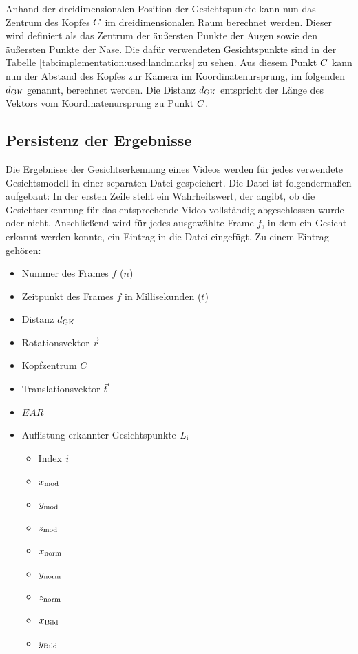 Anhand der dreidimensionalen Position der Gesichtspunkte kann nun das Zentrum des Kopfes $C$ im dreidimensionalen Raum berechnet werden. Dieser wird definiert als das Zentrum der äußersten Punkte der Augen sowie den äußersten Punkte der Nase. Die dafür verwendeten Gesichtspunkte sind in der Tabelle  \ref{tab:implementation:used:landmarks} zu sehen.
Aus diesem Punkt $C$ kann nun der Abstand des Kopfes zur Kamera im Koordinatenursprung, im folgenden $d_{\text{GK}}$ genannt, berechnet werden. Die Distanz $d_{\text{GK}}$ entspricht der Länge des Vektors vom Koordinatenursprung zu Punkt $C$.

\subsection{Persistenz der Ergebnisse}

Die Ergebnisse der Gesichtserkennung eines Videos werden für jedes verwendete Gesichtsmodell in einer separaten Datei gespeichert. Die Datei ist folgendermaßen aufgebaut: In der ersten Zeile steht ein Wahrheitswert, der angibt, ob die Gesichtserkennung für das entsprechende Video vollständig abgeschlossen wurde oder nicht. Anschließend wird für jedes ausgewählte Frame $f$, in dem ein Gesicht erkannt werden konnte, ein Eintrag in die Datei eingefügt. Zu einem Eintrag gehören:

\begin{itemize}
    \item Nummer des Frames $f$ ($n$)
    \item Zeitpunkt des Frames $f$ in Millisekunden ($t$)
    \item Distanz $d_{\text{GK}}$
    \item Rotationsvektor $\vec{r}$
    \item Kopfzentrum $C$
    \item Translationsvektor $\vec{t}$ 
    \item $EAR$
    \item Auflistung erkannter Gesichtspunkte $L_{\text{i}}$
    \begin{itemize}
        \item Index $i$
        \item $x_{\text{mod}}$
        \item $y_{\text{mod}}$
        \item $z_{\text{mod}}$
        \item $x_{\text{norm}}$
        \item $y_{\text{norm}}$
        \item $z_{\text{norm}}$
        \item $x_{\text{Bild}}$
        \item $y_{\text{Bild}}$
    \end{itemize}
\end{itemize}

